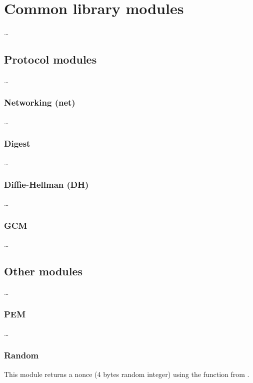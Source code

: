 \section{Common library modules}\label{sec:commonmod}

\ldots

\subsection{Protocol modules}\label{subsec:protomods}

\ldots

\subsubsection{Networking (net)}

\ldots

\subsubsection{Digest}

\ldots

\subsubsection{Diffie-Hellman (DH)}

\ldots

\subsubsection{GCM}

\ldots

\subsection{Other modules}\label{subsec:othermods}

\ldots

\subsubsection{PEM}

\ldots

\subsubsection{Random}

This module returns a nonce (4 bytes random integer) using the
 function from \openssl.

